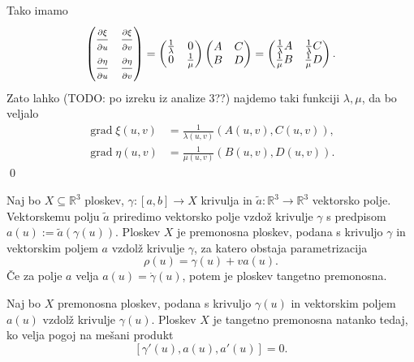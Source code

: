 Tako imamo \begin{equation*}
  \begin{pmatrix}
    \frac{ \strut\partial \xi }{ \strut\partial u }  & \frac{ \strut\partial \xi }{ \strut\partial v }  \\
    \frac{ \strut\partial \eta }{ \strut\partial u }  & \frac{ \strut\partial \eta }{ \strut\partial v } 
    \end{pmatrix} = \begin{pmatrix}
      \frac{1}{\lambda} & 0  \\ 0 & \frac{1}{\mu} 
      \end{pmatrix}\begin{pmatrix}
      A & C \\
      B & D
      \end{pmatrix} = \begin{pmatrix}
        \frac{1}{\lambda} A & \frac{1}{\lambda} C \\
        \frac{1}{\mu} B & \frac{1}{\mu} D
        \end{pmatrix}.
\end{equation*}  
Zato lahko (TODO: po izreku iz analize 3??)
najdemo taki funkciji $\lambda, \mu$, da bo veljalo \begin{align*}
  \operatorname{grad} \xi (u,v) &= \frac{1}{\lambda(u,v)}(A(u,v), C(u,v)), \\
  \operatorname{grad} \eta (u,v) &= \frac{1}{\mu(u,v)}(B(u,v), D(u,v)).
\end{align*}
\qed

\begin{definicija}
\label{def_premnosna_ploskev}
Naj bo $X \subseteq  \mathbb{R}^3$ ploskev, $\gamma: [a,b] \to X$ krivulja in $\tilde{a}: \mathbb{R}^3 \to \mathbb{R}^3$ vektorsko polje. 
Vektorskemu polju $\tilde{a}$ priredimo vektorsko polje vzdož krivulje $\gamma$ s predpisom $a(u) := \tilde{a}(\gamma(u))$. 
Ploskev $X$ je premonosna ploskev, podana s krivuljo $\gamma$ in vektorskim poljem $a$ vzdolž krivulje $\gamma$, za katero obstaja parametrizacija \begin{equation*}
\rho(u) = \gamma(u) + va(u).
\end{equation*}Če za polje $a$ velja $a(u) = \dot{\gamma}(u)$, potem je ploskev tangetno premonosna.
\end{definicija}


\begin{lema}
\label{lem_tangentno_premonosna_mesani_produkt}
Naj bo $X$ premonosna %
ploskev, podana s krivuljo $\gamma(u)$ in vektorskim poljem $a(u)$ vzdolž krivulje $\gamma(u)$. Ploskev $X$ je
tangetno premonosna natanko tedaj, ko velja pogoj na mešani produkt \begin{equation*}
\left[ \gamma'(u), a(u), a'(u) \right] = 0.
\end{equation*}  
\noindent
\end{lema}

